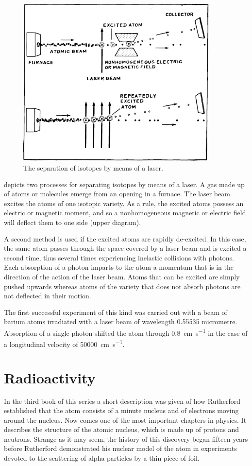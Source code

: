 \begin{figure}[!ht]
\centering
\includegraphics[width=0.9\textwidth]{figures/fig-05-02.pdf}
\caption{The separation of isotopes by means of a laser.}
\label{fig-5.2}
\end{figure}


 depicts two processes for separating isotopes by means of a laser. A gas made up of atoms or molecules emerge from an opening in a furnace. The laser beam excites the atoms of one isotopic variety. As a rule, the excited atoms possess an electric or magnetic moment, and so a nonhomogeneous magnetic or electric field will deflect them to one side (upper diagram).

A second method is used if the excited atoms are rapidly de-excited. In this case, the same atom passes through the space covered by a laser beam and is excited a second time, thus several times experiencing inelastic collisions with photons. Each absorption of a photon imparts to the atom a momentum that is in the direction of the action of the laser beam. Atoms that can be excited are simply pushed upwards whereas atoms of the variety that does not absorb photons are not deflected in their motion.


The first successful experiment of this kind was carried out with a beam of barium atoms irradiated with a laser beam of wavelength \num{0.55535} micrometre. Absorption of a single photon shifted the atom through \SI{0.8}{\centi\meter\per\second} in the case of a longitudinal velocity of \SI{50 000}{\centi\meter\per\second}.

\section{Radioactivity}
In the third book of this series a short description was given of how Rutherford established that the atom consists of a minute nucleus and of electrons moving around the nucleus. Now comes one of the most important chapters in physics. It describes the structure of the atomic nucleus, which is made up of protons and neutrons. Strange as it may seem, the history of this discovery began fifteen years before Rutherford demonstrated his nuclear model of the atom in experiments devoted to the scattering of alpha particles by a thin piece of foil.

